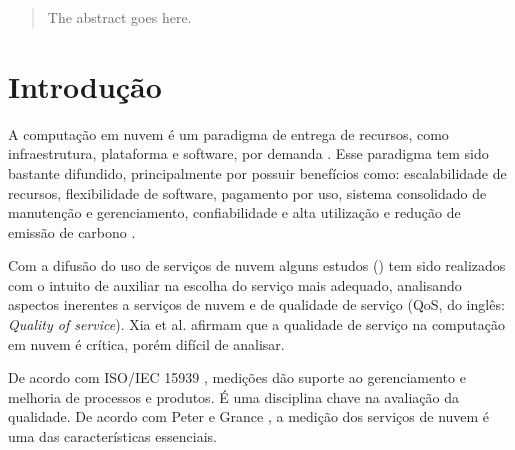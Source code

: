 \documentclass[conference]{IEEEtran}
\begin{document}
\maketitle

\begin{abstract}
The abstract goes here.
\end{abstract}





%
\IEEEpeerreviewmaketitle



\section{Introdução}
A computação em nuvem é um paradigma de entrega de recursos, como infraestrutura, plataforma e software,
por demanda \cite{garg2011}. Esse paradigma tem sido bastante difundido, principalmente por possuir benefícios como: escalabilidade de recursos, flexibilidade de software, pagamento por uso, sistema consolidado de manutenção e gerenciamento, confiabilidade e alta utilização e redução de 
emissão de carbono \cite{rehman2011teaching}.

Com a difusão do uso de serviços de nuvem alguns estudos (\cite{soltani2016, garg2011, li2012, 
bardsiri2014, lesun2016, quarati2016}) tem sido realizados com o intuito de auxiliar na 
escolha do serviço mais adequado, analisando aspectos inerentes a serviços de nuvem e de qualidade de serviço 
(QoS, do inglês: \textit{Quality of service}). Xia et al. \cite{xia2013} afirmam que a qualidade de serviço na computação
em nuvem é crítica, porém difícil de analisar.  

De acordo com ISO/IEC 15939 \cite{iso15939}, medições dão suporte ao gerenciamento e melhoria de processos e produtos. É uma disciplina
chave na avaliação da qualidade. De acordo com Peter e Grance \cite{mell2011nist}, a medição dos serviços de nuvem é 
uma das características essenciais. 
\end{document}
